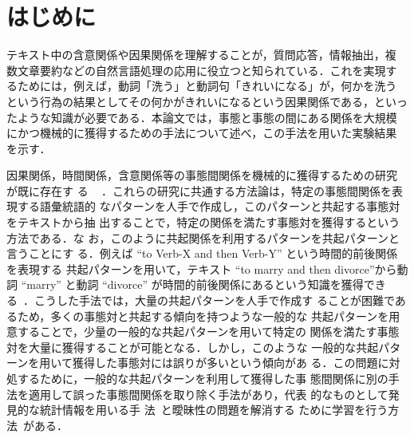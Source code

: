 \documentclass[japanese]{jnlp_1.4}
\begin{document}
\maketitle

\section{はじめに}
\label{sec:introduction}

テキスト中の含意関係や因果関係を理解することが，質問応答，情報抽出，複
数文章要約などの自然言語処理の応用に役立つと知られている．これを実現す
るためには，例えば，動詞「洗う」と動詞句「きれいになる」が，何かを洗う
という行為の結果としてその何かがきれいになるという因果関係である，といっ
たような知識が必要である．本論文では，事態と事態の間にある関係を大規模
にかつ機械的に獲得するための手法について述べ，この手法を用いた実験結果
を示す．

因果関係，時間関係，含意関係等の事態間関係を機械的に獲得するための研究
が既に存在す
る
~\cite[etc.]{Dekang-Lin,inui:DS03,chklovski,torisawa:NAACL,pekar:2006:HLT-NAACL06-Main,zanzotto:06}
．これらの研究に共通する方法論は，特定の事態間関係を表現する語彙統語的
なパターンを人手で作成し，このパターンと共起する事態対をテキストから抽
出することで，特定の関係を満たす事態対を獲得するという方法である．な
お，このように共起関係を利用するパターンを共起パターンと言うことにす
る．例えば ``to Verb-X and then Verb-Y'' という時間的前後関係を表現する
共起パターンを用いて，テキスト ``to marry and then divorce''から動詞
``marry'' と動詞 ``divorce'' が時間的前後関係にあるという知識を獲得でき
る~\cite{chklovski}．こうした手法では，大量の共起パターンを人手で作成す
ることが困難であるため，多くの事態対と共起する傾向を持つような一般的な
共起パターンを用意することで，少量の一般的な共起パターンを用いて特定の
関係を満たす事態対を大量に獲得することが可能となる．しかし，このような
一般的な共起パターンを用いて獲得した事態対には誤りが多いという傾向があ
る．この問題に対処するために，一般的な共起パターンを利用して獲得した事
態間関係に別の手法を適用して誤った事態間関係を取り除く手法があり，代表
的なものとして発見的な統計情報を用いる手
法~\cite{chklovski,torisawa:NAACL,zanzotto:06}と曖昧性の問題を解消する
ために学習を行う方法~\cite{inui:DS03}がある．
\end{document}
